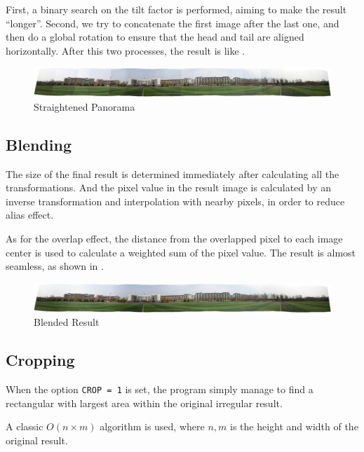 First, a binary search on the tilt factor is performed, aiming to make the result ``longer''.
Second, we try to concatenate the first image after the last one,
and then do a global rotation to ensure that the head and tail are aligned horizontally.
After this two processes, the result is like .

\begin{figure}[H]
  \centering
  \includegraphics[width=\textwidth]{res/unbend.png}
  \caption{Straightened Panorama\label{fig:unbend}}
\end{figure}

\subsection{Blending}
The size of the final result is determined immediately after calculating all the transformations.
And the pixel value in the result image is calculated by an inverse transformation and interpolation with nearby pixels,
in order to reduce alias effect.

As for the overlap effect, the distance from the overlapped pixel to each image center is used to calculate a weighted sum of the pixel value.
The result is almost seamless, as shown in .
\begin{figure}[H]
  \centering
  \includegraphics[width=\textwidth]{res/blend.png}
  \caption{Blended Result\label{fig:blend}}
\end{figure}

\subsection{Cropping}
When the option \verb|CROP = 1| is set,
the program simply manage to find a rectangular with largest area within the original irregular result.

A classic $ O(n \times m)$ algorithm is used, where $ n, m$ is the height and width of the original result.

